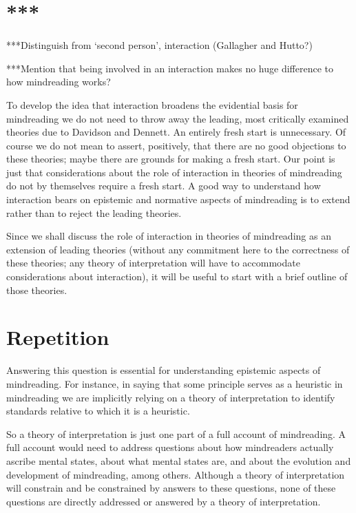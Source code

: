 \documentclass[12pt,a4paper]{extarticle}
\begin{document}
\section{***}
***Distinguish from `second person', interaction (Gallagher and Hutto?)

***Mention that being involved in an interaction makes no huge difference to how mindreading works?


To develop the idea that 
interaction broadens the evidential basis for mindreading
we do not need to throw away the leading, most critically examined theories due to Davidson and Dennett.
An entirely fresh start is unnecessary.
Of course we do not mean to assert, positively, that there are no good objections to these theories; maybe there are grounds for making a fresh start.
Our point is just that considerations about the role of interaction in theories of mindreading do not by themselves require a fresh start.
A good way to understand how interaction bears on epistemic and normative aspects of mindreading is to extend rather than to reject the leading theories.

Since we shall discuss the role of interaction in theories of mindreading as an extension of leading theories (without any commitment here to the correctness of these theories; any theory of interpretation will have to accommodate considerations about interaction), it will be useful to start with a brief outline of those theories.





\section{Repetition}

Answering this question is essential for understanding epistemic aspects of mindreading.  
For instance, in saying that some principle serves as a heuristic in mindreading we are implicitly relying on a theory of interpretation to identify standards relative to which it is a heuristic.

So a theory of interpretation is just one part of a full account of mindreading.
A full account would need to address questions 
about how mindreaders actually ascribe mental states, 
about what mental states are, 
and 
about the evolution and development of mindreading,
among others.
Although a theory of interpretation will constrain and be constrained by answers to these questions,
none of these questions are directly addressed or answered by a theory of interpretation.
\end{document}
